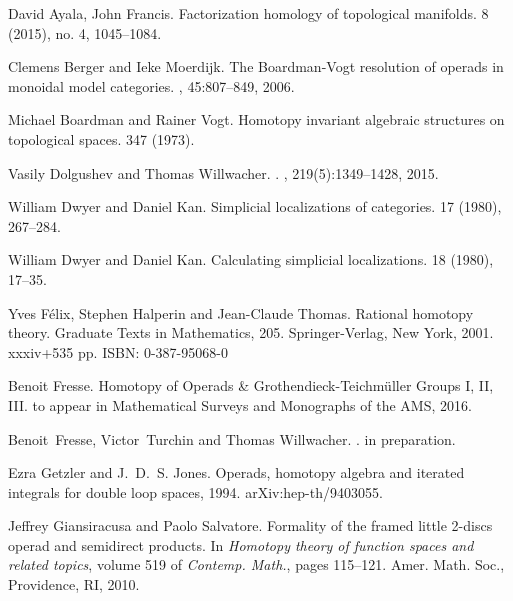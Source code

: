 \documentclass[a4paper]{amsart}
\theoremstyle{plain}
\theoremstyle{definition}
\begin{document}

\begin{thebibliography}{1}

David Ayala, John Francis.
\newblock Factorization homology of topological manifolds.
 8 (2015), no. 4, 1045--1084.

Clemens Berger and Ieke Moerdijk.
\newblock The Boardman-Vogt resolution of operads in monoidal model categories.
, 45:807--849, 2006.

Michael Boardman and Rainer Vogt.
\newblock Homotopy invariant algebraic structures on topological spaces.
 347 (1973).

Vasily Dolgushev and Thomas Willwacher.
.
, 219(5):1349--1428, 2015.

William Dwyer and Daniel Kan.
\newblock Simplicial localizations of categories.
 17 (1980), 267--284.

William Dwyer and Daniel Kan.
\newblock Calculating simplicial localizations.
 18 (1980), 17--35.

Yves F\'elix, Stephen Halperin and Jean-Claude Thomas.
\newblock Rational homotopy theory. 
\newblock Graduate Texts in Mathematics, 205. Springer-Verlag, New York, 2001. xxxiv+535 pp. ISBN: 0-387-95068-0

Benoit Fresse.
\newblock Homotopy of Operads \& Grothendieck-Teichm\"uller Groups I, II, III.
\newblock to appear in Mathematical Surveys and Monographs of the AMS, 2016.

Benoit~Fresse, Victor~Turchin and Thomas Willwacher.
.
\newblock in preparation.

Ezra Getzler and J.~D.~S. Jones.
\newblock Operads, homotopy algebra and iterated integrals for double loop
  spaces, 1994.
\newblock arXiv:hep-th/9403055.

Jeffrey Giansiracusa and Paolo Salvatore.
\newblock Formality of the framed little 2-discs operad and semidirect
  products.
\newblock In {\em Homotopy theory of function spaces and related topics},
  volume 519 of {\em Contemp. Math.}, pages 115--121. Amer. Math. Soc.,
  Providence, RI, 2010.


\end{thebibliography}
\end{document}
